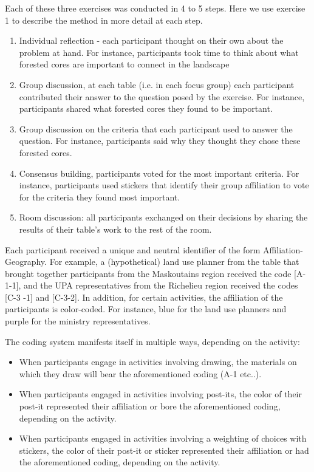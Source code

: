 Each of these three exercises was conducted in 4 to 5 steps. Here we use exercise 1 to describe the method in more detail at each step.

\begin{enumerate}
\item Individual reflection - each participant thought on their own about the problem at hand. For instance, participants took time to think about what forested cores are important to connect in the landscape
\item Group discussion, at each table (i.e. in each focus group) each participant contributed their answer to the question posed by the exercise. For instance, participants shared what forested cores they found to be important.
\item Group discussion on the criteria that each participant used to answer the question. For instance, participants said why they thought they chose these forested cores.
\item Consensus building, participants voted for the most important criteria. For instance, participants used stickers that identify their group affiliation to vote for the criteria they found most important.
\item Room discussion: all participants exchanged on their decisions by sharing the results of their table’s work to the rest of the room.
\end{enumerate}

Each participant received a unique and neutral identifier of the form Affiliation-Geography. For example, a (hypothetical) land use planner from the table that brought together participants from the Maskoutains region received the code [A-1-1], and the UPA representatives from the Richelieu region received the codes [C-3 -1] and [C-3-2]. In addition, for certain activities, the affiliation of the participants is color-coded. For instance, blue for the land use planners and purple for the ministry representatives.

The coding system manifests itself in multiple ways, depending on the activity:
\begin{itemize}
\item When participants engage in activities involving drawing, the materials on which they draw will bear the aforementioned coding (A-1 etc..).
\item When participants engaged in activities involving post-its, the color of their post-it represented their affiliation or bore the aforementioned coding, depending on the activity.
\item When participants engaged in activities involving a weighting of choices with stickers, the color of their post-it or sticker represented their affiliation or had the aforementioned coding, depending on the activity.
\end{itemize}


